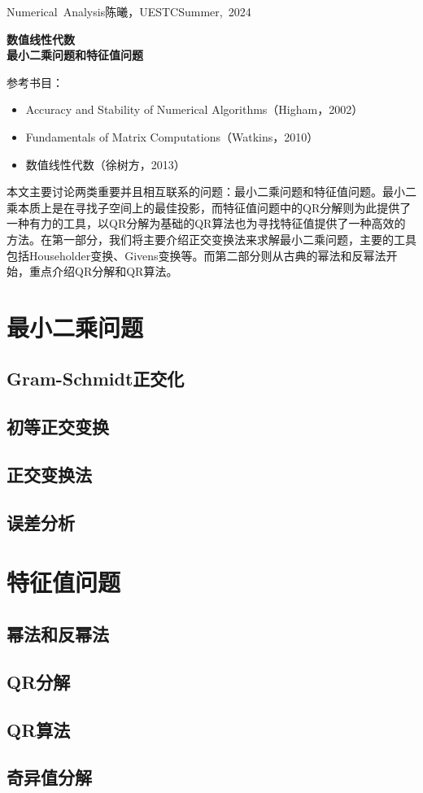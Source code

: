 \documentclass[a4paper,10pt]{ctexart}
\begin{document}
\hfill\vbox{\hbox{Numerical Analysis}\hbox{陈曦，UESTC}\hbox{Summer, 2024}}

\begin{center}\Large
    \textbf{数值线性代数}\\{\normalsize\bf {最小二乘问题和特征值问题}}
\end{center}
\vskip 30pt
\small {参考书目：
\begin{itemize}
    \item Accuracy and Stability of Numerical Algorithms（Higham，2002）
    \item Fundamentals of Matrix Computations（Watkins，2010）
    \item 数值线性代数（徐树方，2013）
\end{itemize}}

本文主要讨论两类重要并且相互联系的问题：最小二乘问题和特征值问题。最小二乘本质上是在寻找子空间上的最佳投影，而特征值问题中的QR分解则为此提供了一种有力的工具，以QR分解为基础的QR算法也为寻找特征值提供了一种高效的方法。在第一部分，我们将主要介绍正交变换法来求解最小二乘问题，主要的工具包括Householder变换、Givens变换等。而第二部分则从古典的幂法和反幂法开始，重点介绍QR分解和QR算法。

\section{最小二乘问题}

\subsection{Gram-Schmidt正交化}

\subsection{初等正交变换}

\subsection{正交变换法}

\subsection{误差分析}

\section{特征值问题}

\subsection{幂法和反幂法}

\subsection{QR分解}

\subsection{QR算法}

\subsection{奇异值分解}


\end{document}
